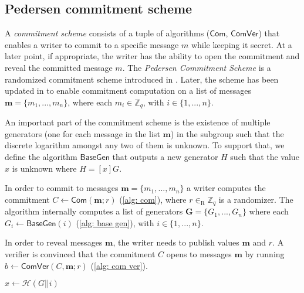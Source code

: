 \subsection{Pedersen commitment scheme}
A \textit{commitment scheme} consists of a tuple of algorithms ($\mathsf{Com}$, $\mathsf{ComVer}$) that enables a writer to commit to a specific message $m$ while keeping it secret. At a later point, if appropriate, the writer has the ability to open the commitment and reveal the committed message $m$. The \textit{Pedersen Commitment Scheme} is a randomized commitment scheme introduced in \cite{Pedersen91-commitment}. Later, the scheme has been updated in \cite{Bootle18} to enable commitment computation on a list of messages $\boldsymbol{m} = \{ m_1, ..., m_n \}$, where each $m_i \in \mathbb{Z}_q$, with $i \in \{ 1, ..., n \}$.

An important part of the commitment scheme is the existence of multiple generators (one for each message in the list  $\boldsymbol{m}$) in the subgroup such that the discrete logarithm amongst any two of them is unknown. To support that, we define the algorithm $\mathsf{BaseGen}$ that outputs a new generator $H$ such that the value $x$ is unknown where $H = [x]G$.

In order to commit to messages $\boldsymbol{m} = \{ m_1, ..., m_n \}$ a writer computes the commitment $C \gets \mathsf{Com}(\boldsymbol{m}; r)$ (\cref{alg: com}), where $r \in_\mathrm{R} \mathbb{Z}_q$ is a randomizer. The algorithm internally computes a list of generators $\boldsymbol{G} = \{ G_1, ..., G_n \}$ where each $G_i \gets \mathsf{BaseGen}(i)$ (\cref{alg: base gen}), with $i \in \{ 1, ..., n \}$.

In order to reveal messages $\boldsymbol{m}$, the writer needs to publish values $\boldsymbol{m}$ and $r$. A verifier is convinced that the commitment $C$ opens to messages $\boldsymbol{m}$ by running $b \gets \mathsf{ComVer}(C, \boldsymbol{m}; r)$ (\cref{alg: com ver}).

\begin{algorithm}[ht]
    \DontPrintSemicolon
    \caption{$\mathsf{BaseGen} (i)$}
    
    $x \gets \mathcal{H}(G || i)$ \\
     
    
    \label{alg: base gen}
\end{algorithm}

